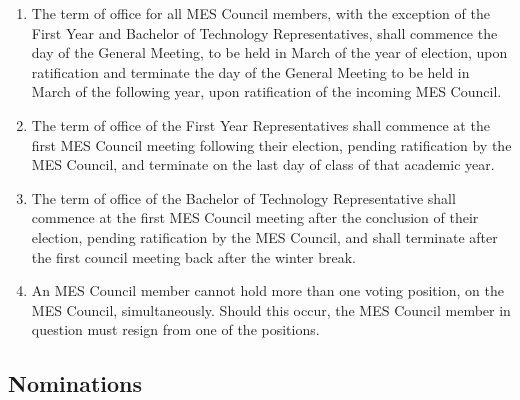 \begin{enumerate}
 \item
  The term of office for all MES Council members, with the exception of
  the First Year and Bachelor of Technology Representatives, shall
  commence the day of the General Meeting, to be held in March of the
  year of election, upon ratification and terminate the day of the
  General Meeting to be held in March of the following year, upon
  ratification of the incoming MES Council.
 \item
  The term of office of the First Year Representatives shall commence at
  the first MES Council meeting following their election, pending
  ratification by the MES Council, and terminate on the last day of
  class of that academic year.
 \item
  The term of office of the Bachelor of Technology Representative shall
  commence at the first MES Council meeting after the conclusion of
  their election, pending ratification by the MES Council, and shall
  terminate after the first council meeting back after the winter break.
 \item
  An MES Council member cannot hold more than one voting position, on
  the MES Council, simultaneously. Should this occur, the MES Council
  member in question must resign from one of the positions.

\end{enumerate}
\hypertarget{nominations}{%
 \subsection{Nominations}
 \label{nominations}}
